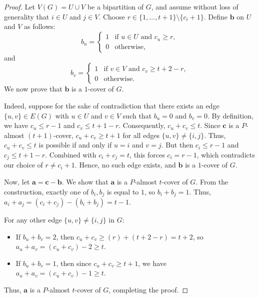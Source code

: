 \documentclass[12pt,amscd]{amsart}
\theoremstyle{definition}
\numberwithin{equation}{section}
\begin{document}
\begin{proof}
Let $V(G) = U \cup V$ be a bipartition of $G$, and assume without loss of generality that $i \in U$ and $j \in V$. Choose $r \in \{1, \ldots, t+1\} \setminus \{c_i + 1\}$. Define $\mathbf{b}$ on $U$ and $V$ as follows:
\[
b_u = \begin{cases} 
1 & \text{if } u \in U \text{ and } c_u \ge r, \\
0 & \text{otherwise,} 
\end{cases}
\]
and
\[
b_v = \begin{cases} 
1 & \text{if } v \in V \text{ and } c_v \ge t + 2 - r, \\
0 & \text{otherwise.} 
\end{cases}
\]
We now prove that $\mathbf{b}$ is a $1$-cover of $G$.

Indeed, suppose for the sake of contradiction that there exists an edge $\{u,v\} \in E(G)$ with $u \in U$ and $v \in V$ such that $b_u = 0$ and $b_v = 0$. By definition, we have $c_u \le r - 1$ and $c_v \le t + 1 - r$. Consequently, $c_u + c_v \le t$. Since $\mathbf{c}$ is a $P$-almost $(t+1)$-cover, $c_u + c_v \ge t+1$ for all edges $\{u,v\} \neq \{i,j\}$. Thus, $c_u + c_v \le t$ is possible if and only if $u = i$ and $v = j$. But then $c_i \le r - 1$ and $c_j \le t + 1 - r$. Combined with $c_i + c_j = t$, this forces $c_i = r - 1$, which contradicts our choice of $r \neq c_i + 1$. Hence, no such edge exists, and $\mathbf{b}$ is a $1$-cover of $G$.

Now, let $\mathbf{a} = \mathbf{c} - \mathbf{b}$. We show that $\mathbf{a}$ is a $P$-almost $t$-cover of $G$. From the construction, exactly one of $b_i, b_j$ is equal to $1$, so $b_i + b_j = 1$. Thus, $a_i + a_j = (c_i + c_j) - (b_i + b_j) = t - 1$. 

For any other edge $\{u,v\} \neq \{i,j\}$ in $G$:
\begin{itemize}
    \item If $b_u + b_v = 2$, then $c_u + c_v \ge (r) + (t + 2 - r) = t + 2$, so $a_u + a_v = (c_u + c_v) - 2 \ge t$.
    \item If $b_u + b_v = 1$, then since $c_u + c_v \ge t + 1$, we have $a_u + a_v = (c_u + c_v) - 1 \ge t$.
\end{itemize}
Thus, $\mathbf{a}$ is a $P$-almost $t$-cover of $G$, completing the proof.
\end{proof}
\end{document}
